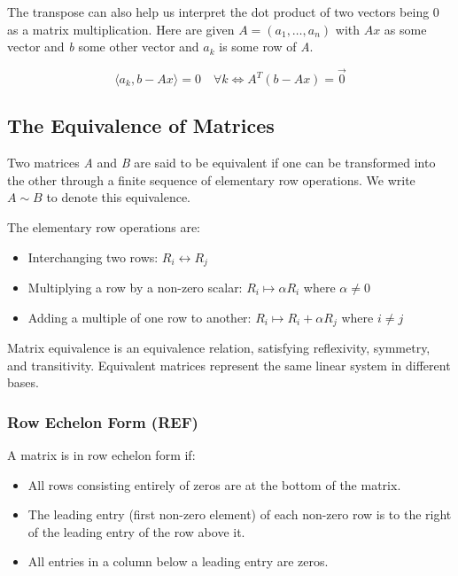 The transpose can also help us interpret the dot product of two vectors being 0 as a matrix multiplication.
Here are given \(A = (a_1, \dots, a_n)\) with \(Ax\) as some vector and \emph{b} some other vector and 
\(a_k\) is some row of \emph{A}.

\[
    \langle a_k, b - Ax \rangle = 0 \quad \forall k \iff A^{T} (b - Ax) = \vec{0}
\]

\subsection{The Equivalence of Matrices}

Two matrices \emph{A} and \emph{B} are said to be equivalent if one can be transformed into the other through a finite sequence of elementary row operations. We write \(A \sim B\) to denote this equivalence.

The elementary row operations are:

\begin{itemize}
    \item Interchanging two rows: \(R_i \leftrightarrow R_j\)
    \item Multiplying a row by a non-zero scalar: \(R_i \mapsto \alpha R_i\) where \(\alpha \neq 0\)
    \item Adding a multiple of one row to another: \(R_i \mapsto R_i + \alpha R_j\) where \(i \neq j\)
\end{itemize}

Matrix equivalence is an equivalence relation, satisfying reflexivity, symmetry, and transitivity. Equivalent matrices represent the same linear system in different bases.

\subsubsection{Row Echelon Form (REF)}

A matrix is in row echelon form if:

\begin{itemize}
    \item All rows consisting entirely of zeros are at the bottom of the matrix.
    \item The leading entry (first non-zero element) of each non-zero row is to the right of the leading entry of the row above it.
    \item All entries in a column below a leading entry are zeros.
\end{itemize}

